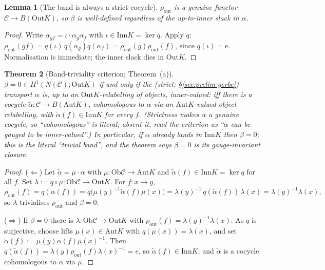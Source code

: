 \documentclass[11pt]{article}
\newtheorem{theorem}{Theorem}
\newtheorem{lemma}[theorem]{Lemma}
\theoremstyle{definition}
\newcommand{\C}{\mathcal{C}}
\newcommand{\Ob}{\mathrm{Ob}}
\newcommand{\Aut}{\mathrm{Aut}}
\newcommand{\Inn}{\mathrm{Inn}}
\newcommand{\Out}{\mathrm{Out}}
\begin{document}
\begin{lemma}[The band is always a strict cocycle]\label{lem:band0}
$\rho_{\mathrm{out}}$ is a genuine functor $\C\to B(\Out K)$, so $\beta$ is well-defined
regardless of the up-to-inner slack in $\alpha$.
\end{lemma}

\begin{proof}
Write $\alpha_{gf}=\iota\cdot\alpha_g\alpha_f$ with $\iota\in\Inn K=\ker q$. Apply $q$:
$\rho_{\mathrm{out}}(gf)=q(\iota)\,q(\alpha_g)q(\alpha_f)=\rho_{\mathrm{out}}(g)\rho_{\mathrm{out}}(f)$,
since $q(\iota)=e$. Normalisation is immediate; the inner slack dies in $\Out K$.
\end{proof}

\begin{theorem}[Band-triviality criterion; Theorem~(a)]\label{thm:band}
$\beta=0\in H^1(N(\C);\Out K)$ if and only if the (strict; \S\ref{sec:prelim-gerbe}) transport
$\alpha$ is, up to an $\Out K$-relabelling of objects, inner-valued: iff there is a cocycle
$\tilde\alpha:\C\to B(\Aut K)$, cohomologous to $\alpha$ via an $\Aut K$-valued object relabelling,
with $\tilde\alpha(f)\in\Inn K$ for every $f$. (Strictness makes $\alpha$ a genuine cocycle, so
``cohomologous'' is literal; absent it, read the criterion as ``$\alpha$ can be gauged to be
inner-valued''.) In particular, if $\alpha$ already lands in $\Inn K$
then $\beta=0$; this is the literal ``trivial band'', and the theorem says $\beta=0$ is its
gauge-invariant closure.
\end{theorem}

\begin{proof}
($\Leftarrow$) Let $\tilde\alpha=\mu\cdot\alpha$ with $\mu:\Ob\C\to\Aut K$ and
$\tilde\alpha(f)\in\Inn K=\ker q$ for all $f$. Set $\lambda:=q\circ\mu:\Ob\C\to\Out K$. For
$f:x\to y$,
\[
\rho_{\mathrm{out}}(f)=q(\alpha(f))=q\big(\mu(y)^{-1}\tilde\alpha(f)\mu(x)\big)
=\lambda(y)^{-1}\,q(\tilde\alpha(f))\,\lambda(x)=\lambda(y)^{-1}\lambda(x),
\]
so $\lambda$ trivialises $\rho_{\mathrm{out}}$ and $\beta=0$.

($\Rightarrow$) If $\beta=0$ there is $\lambda:\Ob\C\to\Out K$ with
$\rho_{\mathrm{out}}(f)=\lambda(y)^{-1}\lambda(x)$. As $q$ is surjective, choose lifts
$\mu(x)\in\Aut K$ with $q(\mu(x))=\lambda(x)$, and set $\tilde\alpha(f):=\mu(y)\alpha(f)\mu(x)^{-1}$.
Then $q(\tilde\alpha(f))=\lambda(y)\rho_{\mathrm{out}}(f)\lambda(x)^{-1}=e$, so
$\tilde\alpha(f)\in\Inn K$; and $\tilde\alpha$ is a cocycle cohomologous to $\alpha$ via $\mu$.
\end{proof}
\end{document}
